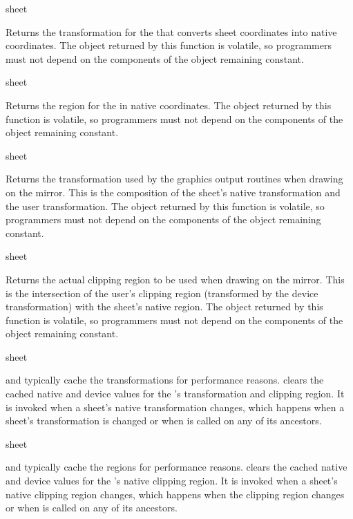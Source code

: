  {sheet}

Returns the transformation for the   that converts sheet
coordinates into native coordinates.  The object returned by this function is
volatile, so programmers must not depend on the components of the object
remaining constant.

 {sheet}

Returns the region for the   in native coordinates.  The
object returned by this function is volatile, so programmers must not depend on
the components of the object remaining constant.

 {sheet}

Returns the transformation used by the graphics output routines when drawing on
the mirror.  This is the composition of the sheet's native transformation and
the user transformation.  The object returned by this function is volatile, so
programmers must not depend on the components of the object remaining constant.

 {sheet}

Returns the actual clipping region to be used when drawing on the mirror.  This
is the intersection of the user's clipping region (transformed by the device
transformation) with the sheet's native region.  The object returned by this
function is volatile, so programmers must not depend on the components of the
object remaining constant.

 {sheet}

 and  typically
cache the transformations for performance reasons.
 clears the cached native and device
values for the  's transformation and clipping region.
It is invoked when a sheet's native transformation changes, which happens when a
sheet's transformation is changed or when 
is called on any of its ancestors.

 {sheet}

 and  typically cache the
regions for performance reasons.   clears the
cached native and device values for the  's native
clipping region.  It is invoked when a sheet's native clipping region changes,
which happens when the clipping region changes or when
 is called on any of its ancestors.

